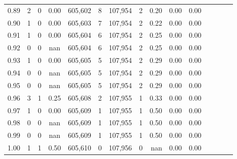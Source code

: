 \begin{tabular}{rrrcrrrrrrrrrrr}
0.89 &       2 &      0 &                                       0.00 &  605,602 &        8 &  107,954 &        2 &  0.20 &  0.00 &                         0.00 \\
0.90 &       1 &      0 &                                       0.00 &  605,603 &        7 &  107,954 &        2 &  0.22 &  0.00 &                         0.00 \\
0.91 &       1 &      0 &                                       0.00 &  605,604 &        6 &  107,954 &        2 &  0.25 &  0.00 &                         0.00 \\
0.92 &       0 &      0 &                                        nan &  605,604 &        6 &  107,954 &        2 &  0.25 &  0.00 &                         0.00 \\
0.93 &       1 &      0 &                                       0.00 &  605,605 &        5 &  107,954 &        2 &  0.29 &  0.00 &                         0.00 \\
0.94 &       0 &      0 &                                        nan &  605,605 &        5 &  107,954 &        2 &  0.29 &  0.00 &                         0.00 \\
0.95 &       0 &      0 &                                        nan &  605,605 &        5 &  107,954 &        2 &  0.29 &  0.00 &                         0.00 \\
0.96 &       3 &      1 &                                       0.25 &  605,608 &        2 &  107,955 &        1 &  0.33 &  0.00 &                         0.00 \\
0.97 &       1 &      0 &                                       0.00 &  605,609 &        1 &  107,955 &        1 &  0.50 &  0.00 &                         0.00 \\
0.98 &       0 &      0 &                                        nan &  605,609 &        1 &  107,955 &        1 &  0.50 &  0.00 &                         0.00 \\
0.99 &       0 &      0 &                                        nan &  605,609 &        1 &  107,955 &        1 &  0.50 &  0.00 &                         0.00 \\
1.00 &       1 &      1 &                                       0.50 &  605,610 &        0 &  107,956 &        0 &   nan &  0.00 &                         0.00 \\
\bottomrule
\end{tabular}
